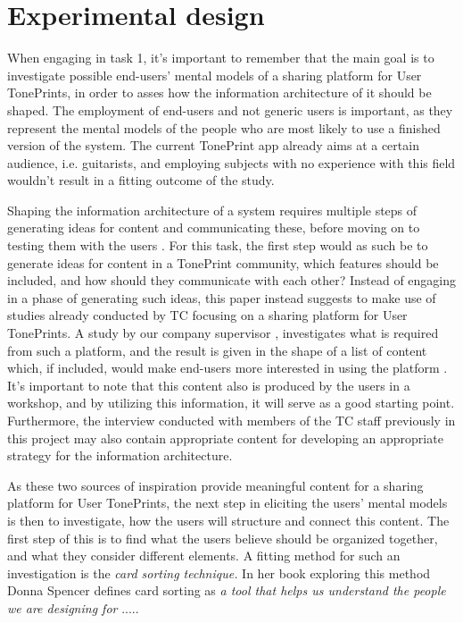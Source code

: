 
\section{Experimental design}
\label{ExperimentalDesign}
When engaging in task 1, it's important to remember that the main goal is to investigate possible end-users' mental models of a sharing platform for User TonePrints, in order to asses how the information architecture of it should be shaped. The employment of end-users and not generic users is important, as they represent the mental models of the people who are most likely to use a finished version of the system. The current TonePrint app already aims at a certain audience, i.e. guitarists, and employing subjects with no experience with this field wouldn't result in a fitting outcome of the study.

Shaping the information architecture of a system requires multiple steps of generating ideas for content and communicating these, before moving on to testing them with the users \parencite[][356-364]{PDF:InformationArchitecture}. For this task, the first step would as such be to generate ideas for content in a TonePrint community, which features should be included, and how should they communicate with each other? Instead of engaging in a phase of generating such ideas, this paper instead suggests to make use of studies already conducted by TC focusing on a sharing platform for User TonePrints. A study by our company supervisor \textcite{PDF:BrugerWorkshopUserTonePrints}, investigates what is required from such a platform, and the result is given in the shape of a list of content which, if included, would make end-users more interested in using the platform \parencite[][35]{PDF:BrugerWorkshopUserTonePrints}. It's important to note that this content also is produced by the users in a workshop, and by utilizing this information, it will serve as a good starting point. Furthermore, the interview conducted with members of the TC staff previously in this project may also contain appropriate content for developing an appropriate strategy for the information architecture.

As these two sources of inspiration provide meaningful content for a sharing platform for User TonePrints, the next step in eliciting the users' mental models is then to investigate, how the users will structure and connect this content. The first step of this is to find what the users believe should be organized together, and what they consider different elements. A fitting method for such an investigation is the \textit{card sorting technique.} In her book exploring this method Donna Spencer defines card sorting as \textit{a tool that helps us understand the people we are designing for} \parencite[][6]{WEB:DonnaSpencer}..... 



